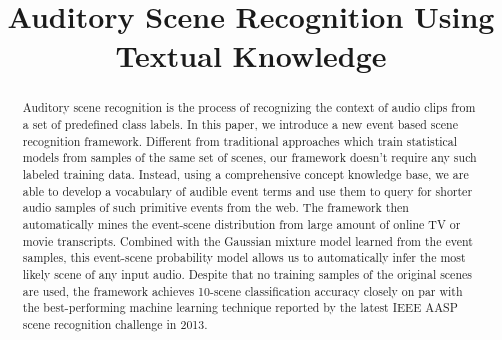 \documentclass[letterpaper]{article}
\newcommand{\tab}{\hspace*{2ex}}
\begin{document}
\title{Auditory Scene Recognition Using Textual Knowledge}
\author{
}

\maketitle

\begin{abstract}
Auditory scene recognition is the process of recognizing 
the context of audio clips from a set of predefined class labels. 
In this paper, we introduce a new event based scene recognition framework.
Different from traditional approaches which train statistical models from
samples of the same set of scenes, our framework doesn't require any such
labeled training data. Instead, using a comprehensive concept knowledge base,
we are able to develop a vocabulary of audible event terms and use them to
query for shorter audio samples of such primitive events from the web.
The framework then automatically mines the event-scene distribution from 
large amount of online TV or movie transcripts. Combined with the Gaussian
mixture model learned from the event samples, this event-scene 
probability model allows us to automatically infer the most likely 
scene of any input audio. Despite that no training samples of the original
scenes are used, the framework achieves 10-scene classification accuracy 
closely 
on par with the best-performing machine learning technique reported 
by the latest IEEE AASP scene recognition challenge in 2013.
\end{abstract}



%

%






\end{document}
